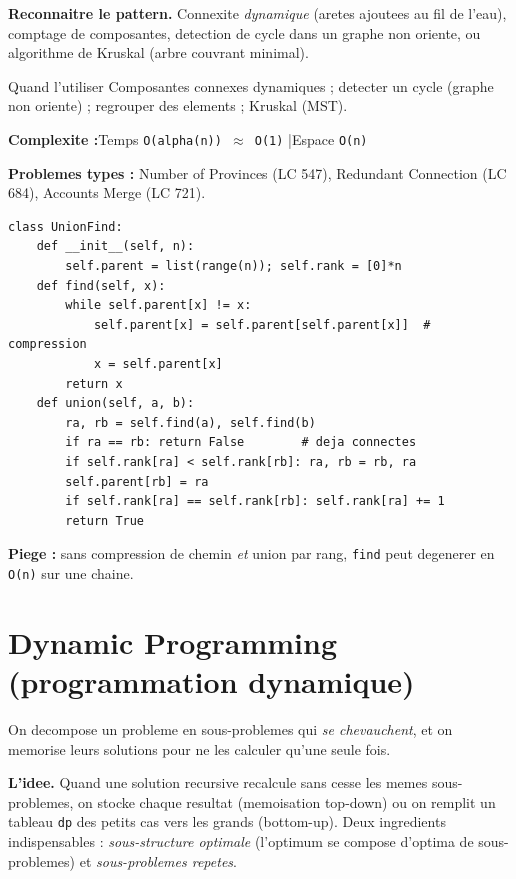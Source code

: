 \documentclass[11pt,a4paper]{article}
\newcommand{\complexite}[2]{%
  \noindent\textbf{Complexite :}\quad Temps \texttt{#1} \quad|\quad Espace \texttt{#2}\par\smallskip}
\newcommand{\leetcode}[1]{\noindent\textbf{Problemes types :} #1\par\medskip}
\begin{document}
\textbf{Reconnaitre le pattern.} Connexite \emph{dynamique} (aretes ajoutees au
fil de l'eau), comptage de composantes, detection de cycle dans un graphe non
oriente, ou algorithme de Kruskal (arbre couvrant minimal).

\begin{infobox}{Quand l'utiliser}
Composantes connexes dynamiques ; detecter un cycle (graphe non oriente) ;
regrouper des elements ; Kruskal (MST).
\end{infobox}

\complexite{O(alpha(n)) $\approx$ O(1)}{O(n)}
\leetcode{Number of Provinces (LC 547), Redundant Connection (LC 684), Accounts Merge (LC 721).}

\begin{lstlisting}
class UnionFind:
    def __init__(self, n):
        self.parent = list(range(n)); self.rank = [0]*n
    def find(self, x):
        while self.parent[x] != x:
            self.parent[x] = self.parent[self.parent[x]]  # compression
            x = self.parent[x]
        return x
    def union(self, a, b):
        ra, rb = self.find(a), self.find(b)
        if ra == rb: return False        # deja connectes
        if self.rank[ra] < self.rank[rb]: ra, rb = rb, ra
        self.parent[rb] = ra
        if self.rank[ra] == self.rank[rb]: self.rank[ra] += 1
        return True
\end{lstlisting}

\textbf{Piege :} sans compression de chemin \emph{et} union par rang, \texttt{find}
peut degenerer en \texttt{O(n)} sur une chaine.

\section{Dynamic Programming (programmation dynamique)}
On decompose un probleme en sous-problemes qui \emph{se chevauchent}, et on
memorise leurs solutions pour ne les calculer qu'une seule fois.

\textbf{L'idee.} Quand une solution recursive recalcule sans cesse les memes
sous-problemes, on stocke chaque resultat (memoisation top-down) ou on remplit un
tableau \texttt{dp} des petits cas vers les grands (bottom-up). Deux ingredients
indispensables : \emph{sous-structure optimale} (l'optimum se compose d'optima de
sous-problemes) et \emph{sous-problemes repetes}.
\end{document}
